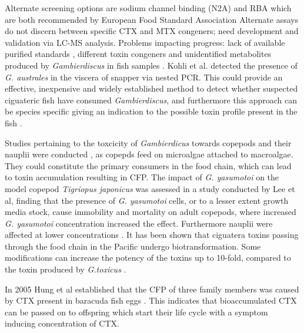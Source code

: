 \documentclass[12pt]{article}
\begin{document}
Alternate screening options are sodium channel binding (N2A) \cite{dickey2010ciguatera} and RBA \cite{poli1997identification,darius2007ciguatera} which are both recommended by European Food Standard Association \cite{} %
Alternate assays do not discern between specific CTX and MTX congeners; need development and validation via LC-MS analysis. Problems impacting progress: lack of available purified standards \cite{}, different toxin congeners and unidentified metabolites produced by \emph{Gambierdiscus} in fish samples \cite{endean1993variation,vernoux1997isolation}.
Kohli et al. detected the presence of \emph{G. australes} in the viscera of snapper via nested PCR. This could provide an effective, inexpensive and widely established method to detect whether suspected ciguateric fish have consumed \emph{Gambierdiscus}, and furthermore this approach can be species specific giving an indication to the possible toxin profile present in the fish \cite{kohli2014feeding}. 

Studies pertaining to the toxcicity of \emph{Gambierdicus} towards copepods and their nauplii were conducted \cite{lee2014toxicity}, as copepds feed on microalgae attached to macroalgae. They could constitute the primary consumers in the food chain, which can lead to toxin accumulation \cite{raisuddin2007copepod} resulting in CFP. The impact of \emph{G. yasumotoi} on the model copepod \emph{Tigriopus japonicus} was assessed in a study conducted by Lee et al, finding that the presence of \emph{G. yasumotoi} cells, or to a lesser extent growth media stock, cause immobility and mortality on adult copepods, where increased \emph{G. yasumotoi} concentration increased the effect. Furthermore nauplii were affected at lower concentrations \cite{lee2014toxicity}.
It has been shown that ciguatera toxins passing through the food chain in the Pacific undergo biotransformation. Some modifications can increase the potency of the toxins up to 10-fold, compared to the toxin produced by \textit{G.toxicus} \cite{lewis2006ciguatera}.

In 2005 Hung et al established that the CFP of three family members was caused by CTX present in baracuda fish eggs \cite{hung2005persistent}. This indicates that bioaccumulated CTX can be passed on to offspring which start their life cycle with a symptom inducing concentration of CTX.
\end{document}
